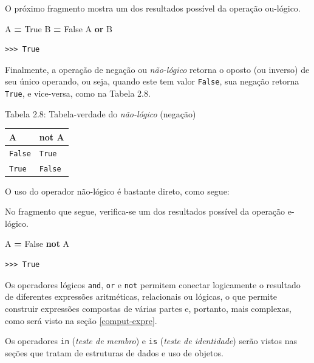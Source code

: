 \documentclass[
]{book}
\newenvironment{Shaded}{\begin{snugshade}}{\end{snugshade}}
\newcommand{\KeywordTok}[1]{\textcolor[rgb]{0.13,0.29,0.53}{\textbf{#1}}}
\newcommand{\NormalTok}[1]{#1}
\newcommand{\OperatorTok}[1]{\textcolor[rgb]{0.81,0.36,0.00}{\textbf{#1}}}
\newcommand{\VariableTok}[1]{\textcolor[rgb]{0.00,0.00,0.00}{#1}}
\begin{document}
O próximo fragmento mostra um dos resultados possível da operação ou-lógico.

\begin{Shaded}
\begin{Highlighting}[]
\NormalTok{A }\OperatorTok{=} \VariableTok{True}
\NormalTok{B }\OperatorTok{=} \VariableTok{False}
\NormalTok{A }\KeywordTok{or}\NormalTok{ B}
\end{Highlighting}
\end{Shaded}

\begin{verbatim}
>>> True
\end{verbatim}

Finalmente, a operação de negação ou \emph{não-lógico} retorna o oposto (ou inverso) de seu único operando, ou seja, quando este tem valor \texttt{False}, sua negação retorna \texttt{True}, e vice-versa, como na Tabela 2.8.

Tabela 2.8: Tabela-verdade do \emph{não-lógico} (negação)

\begin{longtable}[]{@{}ll@{}}
\toprule
A & not A \\
\midrule
\endhead
\texttt{False} & \texttt{True} \\
\texttt{True} & \texttt{False} \\
\bottomrule
\end{longtable}

O uso do operador não-lógico é bastante direto, como segue:

No fragmento que segue, verifica-se um dos resultados possível da operação e-lógico.

\begin{Shaded}
\begin{Highlighting}[]
\NormalTok{A }\OperatorTok{=} \VariableTok{False}
\KeywordTok{not}\NormalTok{ A}
\end{Highlighting}
\end{Shaded}

\begin{verbatim}
>>> True
\end{verbatim}

Os operadores lógicos \texttt{and}, \texttt{or} e \texttt{not} permitem conectar logicamente o resultado de diferentes expressões aritméticas, relacionais ou lógicas, o que permite construir expressões compostas de várias partes e, portanto, mais complexas, como será visto na seção \ref{comput-expre}.

Os operadores \texttt{in} (\emph{teste de membro}) e \texttt{is} (\emph{teste de identidade}) serão vistos nas seções que tratam de estruturas de dados e uso de objetos.
\end{document}

